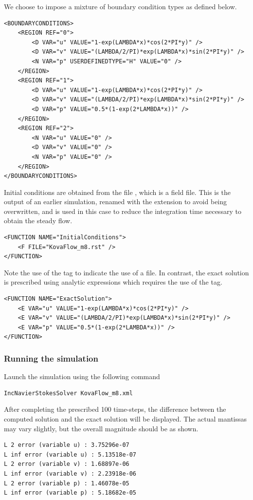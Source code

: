 We choose to impose a mixture of boundary condition types as defined below.

\begin{lstlisting}[style=XMLStyle]
<BOUNDARYCONDITIONS>
    <REGION REF="0">
        <D VAR="u" VALUE="1-exp(LAMBDA*x)*cos(2*PI*y)" />
        <D VAR="v" VALUE="(LAMBDA/2/PI)*exp(LAMBDA*x)*sin(2*PI*y)" />
        <N VAR="p" USERDEFINEDTYPE="H" VALUE="0" />
    </REGION>
    <REGION REF="1">
        <D VAR="u" VALUE="1-exp(LAMBDA*x)*cos(2*PI*y)" />
        <D VAR="v" VALUE="(LAMBDA/2/PI)*exp(LAMBDA*x)*sin(2*PI*y)" />
        <D VAR="p" VALUE="0.5*(1-exp(2*LAMBDA*x))" />
    </REGION>
    <REGION REF="2">
        <N VAR="u" VALUE="0" />
        <D VAR="v" VALUE="0" />
        <N VAR="p" VALUE="0" />
    </REGION>
</BOUNDARYCONDITIONS>
\end{lstlisting}

Initial conditions are obtained from the file , which is
a \nekpp field file. This is the output of an earlier simulation, renamed with
the extension  to avoid being overwritten, and is used in this case
to reduce the integration time necessary to obtain the steady flow.
\begin{lstlisting}[style=XMLStyle]
<FUNCTION NAME="InitialConditions">
    <F FILE="KovaFlow_m8.rst" />
</FUNCTION>
\end{lstlisting}
Note the use of the  tag to indicate the use of a file. In contrast,
the exact solution is prescribed using analytic expressions which requires the
use of the  tag.
\begin{lstlisting}[style=XMLStyle]
<FUNCTION NAME="ExactSolution">
    <E VAR="u" VALUE="1-exp(LAMBDA*x)*cos(2*PI*y)" />
    <E VAR="v" VALUE="(LAMBDA/2/PI)*exp(LAMBDA*x)*sin(2*PI*y)" />
    <E VAR="p" VALUE="0.5*(1-exp(2*LAMBDA*x))" />
</FUNCTION>
\end{lstlisting}

\subsubsection{Running the simulation}
Launch the simulation using the following command
\begin{lstlisting}[style=BashInputStyle]
IncNavierStokesSolver KovaFlow_m8.xml
\end{lstlisting}
After completing the prescribed 100 time-steps, the difference between the
computed solution and the exact solution will be displayed. The actual mantissas
may vary slightly, but the overall magnitude should be as shown.
\begin{lstlisting}[style=BashInputStyle]
L 2 error (variable u) : 3.75296e-07
L inf error (variable u) : 5.13518e-07
L 2 error (variable v) : 1.68897e-06
L inf error (variable v) : 2.23918e-06
L 2 error (variable p) : 1.46078e-05
L inf error (variable p) : 5.18682e-05
\end{lstlisting}

